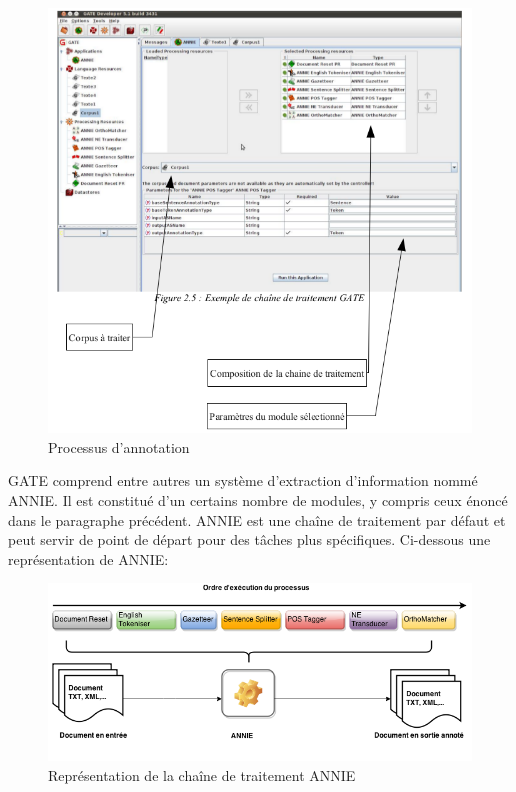 \documentclass[a4paper, 11pt]{report}
\begin{document}
\begin{figure}[h]
\begin{center}
\includegraphics[scale=0.3]{img/exempleChaineTraitement.png}
\end{center}
\caption{Processus d'annotation}
\end{figure}
GATE comprend entre autres un système d'extraction d'information nommé ANNIE. Il est constitué d'un certains nombre de modules, y compris ceux énoncé dans le paragraphe précédent. ANNIE est une chaîne de traitement par défaut et peut servir de point de départ pour des tâches plus spécifiques. Ci-dessous une représentation de ANNIE: 
\begin{figure}[h]
\begin{center}
\includegraphics[scale=0.5]{img/annieChaine.png} 
\end{center}
\caption{Représentation de la chaîne de traitement ANNIE}
\end{figure}
\end{document}

